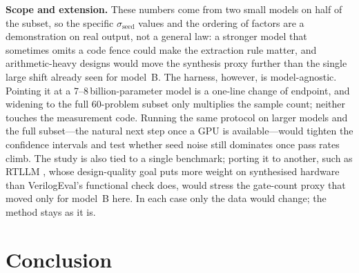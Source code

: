 \documentclass[conference]{IEEEtran}
\begin{document}
\noindent \textbf{Scope and extension.} These numbers come from two small models on half of the subset, so the specific $\sigma_{\text{seed}}$ values and the ordering of factors are a demonstration on real output, not a general law: a stronger model that sometimes omits a code fence could make the extraction rule matter, and arithmetic-heavy designs would move the synthesis proxy further than the single large shift already seen for model~B. The harness, however, is model-agnostic. Pointing it at a 7--8\,billion-parameter model is a one-line change of endpoint, and widening to the full 60-problem subset only multiplies the sample count; neither touches the measurement code. Running the same protocol on larger models and the full subset---the natural next step once a GPU is available---would tighten the confidence intervals and test whether seed noise still dominates once pass rates climb. The study is also tied to a single benchmark; porting it to another, such as RTLLM \cite{P16_Lu2024}, whose design-quality goal puts more weight on synthesised hardware than VerilogEval's functional check does, would stress the gate-count proxy that moved only for model~B here. In each case only the data would change; the method stays as it is.

\section{Conclusion}\label{sec_conclusion}
\end{document}
